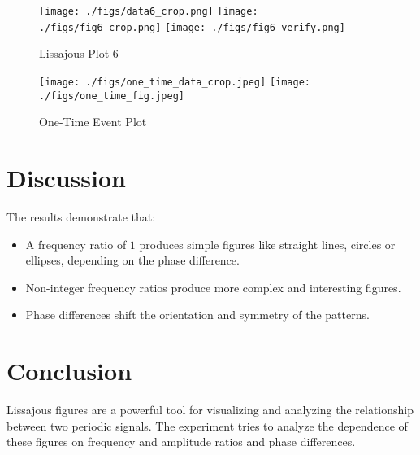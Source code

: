 \documentclass[12pt]{article}
\begin{document}
\begin{figure*}[ht!]
    {\texttt{[image: ./figs/data6\_crop.png]}}
    \hspace{\fill}
    {\texttt{[image: ./figs/fig6\_crop.png]}}
    \hspace{\fill}
    {\texttt{[image: ./figs/fig6\_verify.png]}}\\
    \caption{Lissajous Plot 6}
\end{figure*}
\begin{figure*}[ht!]
    {\texttt{[image: ./figs/one\_time\_data\_crop.jpeg]}}
    \hspace{\fill}
    {\texttt{[image: ./figs/one\_time\_fig.jpeg]}}
    \caption{One-Time Event Plot}
\end{figure*}

\section{Discussion}
The results demonstrate that:
\begin{itemize}
    \item A frequency ratio of $1$ produces simple figures like straight lines, circles or ellipses, depending on the phase difference.
    \item Non-integer frequency ratios produce more complex and interesting figures.
    \item Phase differences shift the orientation and symmetry of the patterns.
\end{itemize}

\section{Conclusion}
Lissajous figures are a powerful tool for visualizing and analyzing the relationship between two periodic signals. The experiment tries to analyze the dependence of these figures on frequency and amplitude ratios and phase differences.
\end{document}
